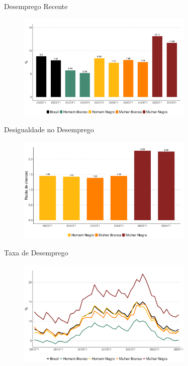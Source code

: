 \documentclass[10pt, xcolor=x11names,compress]{beamer}
\begin{document}
		\begin{frame}{Desemprego Recente}
		\begin{figure}
			\centering
			\includegraphics[width = 0.75\textwidth]{figures_output/unemp.pdf}
		\end{figure}
	\end{frame}
	
		\begin{frame}{Desigualdade no Desemprego}
		\begin{figure}
			\centering
			\includegraphics[width = 0.75\textwidth]{figures_output/frac_unemp.pdf}
		\end{figure}
		\end{frame}
	
	\begin{frame}{Taxa de Desemprego}
		\begin{figure}
			\centering
			\includegraphics[width = 0.75\textwidth]{figures_output/unemp_br_gen_raca.pdf}
		\end{figure}
	\end{frame}			
	
\end{document}
